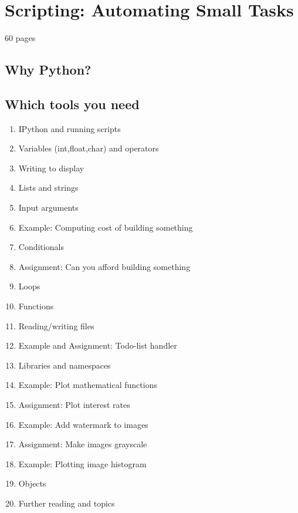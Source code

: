\chapter{Scripting: Automating Small Tasks}
60 pages
\section{Why Python?}
\section{Which tools you need}

\begin{enumerate}
	\item IPython and running scripts
	\item Variables (int,float,char) and operators
	\item Writing to display
	\item Lists and strings
	\item Input arguments
	\item Example: Computing cost of building something
	\item Conditionals
	\item Assignment: Can you afford building something
	\item Loops
	\item Functions
	\item Reading/writing files
	\item Example and Assignment: Todo-list handler
	\item Libraries and namespaces
	\item Example: Plot mathematical functions
	\item Assignment: Plot interest rates
	\item Example: Add watermark to images
	\item Assignment: Make images grayscale
	\item Example: Plotting image histogram
	\item Objects
	\item Further reading and topics
\end{enumerate}